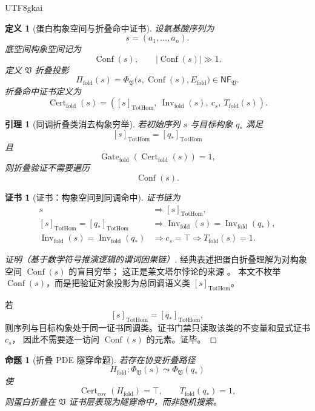 \documentclass[12pt]{article}
\newtheorem{definition}{定义}[section]
\newtheorem{proposition}{命题}[section]
\newtheorem{lemma}{引理}[section]
\newtheorem{Certificate}{证书}[section]
\newcommand{\Vsys}{\mathfrak V}
\newcommand{\NF}{\mathsf{NF}}
\DeclareMathOperator{\Cert}{Cert}
\DeclareMathOperator{\Gate}{Gate}
\DeclareMathOperator{\Inv}{Inv}
\DeclareMathOperator{\TotHom}{TotHom}
\DeclareMathOperator{\Conf}{Conf}
\begin{document}
\begin{CJK*}{UTF8}{gkai}
\begin{definition}[蛋白构象空间与折叠命中证书]
\label{def:tex59-protein-fold-cert}
设氨基酸序列为
\[
  s=(a_1,\ldots,a_n).
\]
底空间构象空间记为
\[
  \Conf(s),
  \qquad
  |\Conf(s)|\gg 1.
\]
定义 \(\Vsys\) 折叠投影
\[
  \Pi_{\mathrm{fold}}(s)
  =
  \Phi_{\Vsys}\bigl(s,\Conf(s),E_{\mathrm{fold}}\bigr)
  \in\NF_{\Vsys}.
\]
折叠命中证书定义为
\[
  \Cert_{\mathrm{fold}}(s)
  =
  \left(
  [s]_{\TotHom},\
  \Inv_{\mathrm{fold}}(s),\
  c_s,\
  T_{\mathrm{fold}}(s)
  \right).
\]
\end{definition}

\begin{lemma}[同调折叠类消去构象穷举]
\label{lem:tex59-fold-homology-class}
若初始序列 \(s\) 与目标构象 \(q_\ast\) 满足
\[
  [s]_{\TotHom}=[q_\ast]_{\TotHom}
\]
且
\[
  \Gate_{\mathrm{fold}}(\Cert_{\mathrm{fold}}(s))=1,
\]
则折叠验证不需要遍历
\[
  \Conf(s).
\]
\end{lemma}

\begin{Certificate}[证书：构象空间到同调命中]
\label{cert:tex59-fold-homology-class}
证书链为
\[
  \begin{aligned}
  s
  &\Longrightarrow
  [s]_{\TotHom},\\
  [s]_{\TotHom}=[q_\ast]_{\TotHom}
  &\Longrightarrow
  \Inv_{\mathrm{fold}}(s)=\Inv_{\mathrm{fold}}(q_\ast),\\
  \Inv_{\mathrm{fold}}(s)=\Inv_{\mathrm{fold}}(q_\ast)
  &\Longrightarrow
  c_s=\top
  \Longrightarrow
  T_{\mathrm{fold}}(s)=1.
  \end{aligned}
\]
\end{Certificate}

\begin{proof}[证明（基于数学符号推演逻辑的谓词因果链）]
{\raggedright
经典表述把蛋白折叠理解为对构象空间 \(\Conf(s)\) 的盲目穷举；
这正是莱文塔尔悖论的来源 \cite{Levinthal1969ProteinFolding}。
本文不枚举 \(\Conf(s)\)，而是把验证对象投影为总同调语义类
\([s]_{\TotHom}\)。\par}
若
\[
  [s]_{\TotHom}=[q_\ast]_{\TotHom},
\]
则序列与目标构象处于同一证书同调类。证书门禁只读取该类的不变量和显式证书 \(c_s\)，
因此不需要逐一访问 \(\Conf(s)\) 的元素。证毕。
\end{proof}

\begin{proposition}[折叠 PDE 隧穿命题]
\label{prop:tex59-fold-tunnel}
若存在协变折叠路径
\[
  H_{\mathrm{fold}}:
  \Phi_{\Vsys}(s)
  \leadsto
  \Phi_{\Vsys}(q_\ast)
\]
使
\[
  \Cert_{\mathrm{cov}}(H_{\mathrm{fold}})=\top,
  \qquad
  T_{\mathrm{fold}}(q_\ast)=1,
\]
则蛋白折叠在 \(\Vsys\) 证书层表现为隧穿命中，而非随机搜索。
\end{proposition}


\end{CJK*}
\end{document}
